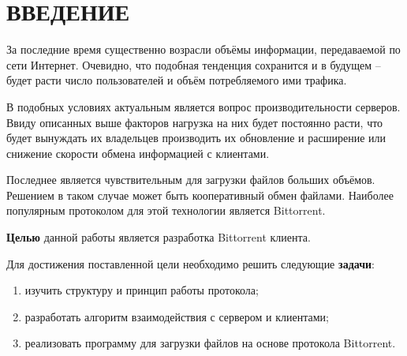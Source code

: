 \section*{ВВЕДЕНИЕ}

За последние время существенно возрасли объёмы информации, передаваемой по сети Интернет. Очевидно, что подобная тенденция сохранится и в будущем -- будет расти число пользователей и объём потребляемого ими трафика.

В подобных условиях актуальным является вопрос производительности серверов. Ввиду описанных выше факторов нагрузка на них будет постоянно расти, что будет вынуждать их владельцев производить их обновление и расширение или снижение скорости обмена информацией с клиентами.

Последнее является чувствительным для загрузки файлов больших объёмов. Решением в таком случае может быть кооперативный обмен файлами. Наиболее популярным протоколом для этой технологии является Bittorrent.

\textbf{Целью} данной работы является разработка Bittorrent клиента.

Для достижения поставленной цели необходимо решить следующие \textbf{задачи}:
\begin{enumerate}
	\item изучить структуру и принцип работы протокола;
	
	\item разработать алгоритм взаимодействия с сервером и клиентами;
	
	\item реализовать программу для загрузки файлов на основе протокола Bittorrent.
\end{enumerate}